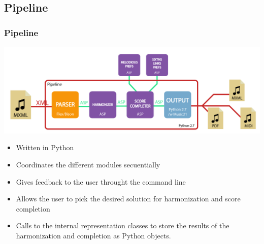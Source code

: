 \documentclass[english]{beamer}
\begin{document}
\subsection{Pipeline}
	\begin{frame}[t]
	\frametitle{Pipeline}
	\begin{center}
			\includegraphics[width=0.6\linewidth]{imagenes/arch_trans/arquitectura_final_pipe-01.png}
			\end{center}
		\begin{itemize}
			\item Written in \alert{Python}
			\pause
			\item Coordinates the different modules secuentially
			\item \alert{Gives feedback} to the user throught the command line
			\pause
			\item Allows the user to pick the desired solution for harmonization and score completion
			\pause
			\item Calls to the \alert{internal representation classes} to store the results of the harmonization and completion as Python objects.
		\end{itemize}
	\end{frame}
\end{document}
